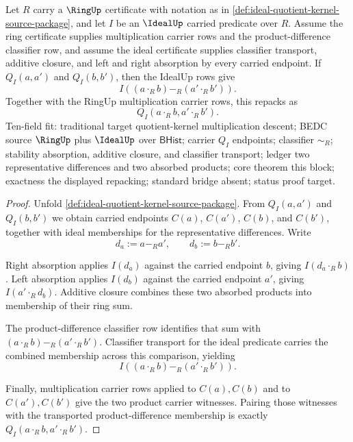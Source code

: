 \begin{theorem}
\label{thm:ideal-quotient-kernel-multiplication-descent}
Let $R$ carry a $\RingUp$ certificate with notation as in \autoref{def:ideal-quotient-kernel-source-package}, and let $I$ be an $\IdealUp$ carried predicate over $R$. Assume the ring certificate supplies multiplication carrier rows and the product-difference classifier row, and assume the ideal certificate supplies classifier transport, additive closure, and left and right absorption by every carried endpoint. If $Q_I(a,a')$ and $Q_I(b,b')$, then the IdealUp rows give
$$
I((a\cdot_R b)-_R(a'\cdot_R b')).
$$
Together with the RingUp multiplication carrier rows, this repacks as
$$
Q_I(a\cdot_R b,a'\cdot_R b').
$$
Ten-field fit: traditional target quotient-kernel multiplication descent; BEDC source $\RingUp$ plus $\IdealUp$ over $\mathsf{BHist}$; carrier $Q_I$ endpoints; classifier $\sim_R$; stability absorption, additive closure, and classifier transport; ledger two representative differences and two absorbed products; core theorem this block; exactness the displayed repacking; standard bridge absent; status proof target.
\end{theorem}
\begin{proof}
Unfold \autoref{def:ideal-quotient-kernel-source-package}. From $Q_I(a,a')$ and $Q_I(b,b')$ we obtain carried endpoints $C(a)$, $C(a')$, $C(b)$, and $C(b')$, together with ideal memberships for the representative differences. Write
$$
d_a:=a-_R a',
\qquad
d_b:=b-_R b'.
$$

Right absorption applies $I(d_a)$ against the carried endpoint $b$, giving $I(d_a\cdot_R b)$. Left absorption applies $I(d_b)$ against the carried endpoint $a'$, giving $I(a'\cdot_R d_b)$. Additive closure combines these two absorbed products into membership of their ring sum.

The product-difference classifier row identifies that sum with $(a\cdot_R b)-_R(a'\cdot_R b')$. Classifier transport for the ideal predicate carries the combined membership across this comparison, yielding
$$
I((a\cdot_R b)-_R(a'\cdot_R b')).
$$

Finally, multiplication carrier rows applied to $C(a),C(b)$ and to $C(a'),C(b')$ give the two product carrier witnesses. Pairing those witnesses with the transported product-difference membership is exactly $Q_I(a\cdot_R b,a'\cdot_R b')$.
\end{proof}

